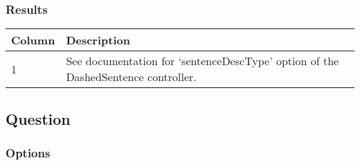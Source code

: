 \documentclass[11pt,letterpaper]{article}
\begin{document}
\normalsize

\subsubsection*{Results}



\footnotesize
\begin{RaggedRight}
\sloppy
\begin{tabular}{|p{1.1189in}|p{4.3811in}|}
\hline
 \textbf{Column}  &  \textbf{Description} \\
\hline
 1         &  See documentation for `sentenceDescType' option of the DashedSentence controller. 
\\\hline
\end{tabular}
\end{RaggedRight}
\fussy

\normalsize

\subsection{Question}

\subsubsection*{Options}
\end{document}
